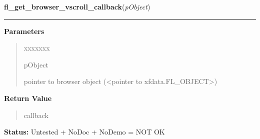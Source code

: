 \hspace{.8\funcindent}\begin{boxedminipage}{\funcwidth}

    \raggedright \textbf{fl\_get\_browser\_vscroll\_callback}(\textit{pObject})

    \vspace{-1.5ex}

    \rule{\textwidth}{0.5\fboxrule}
\setlength{\parskip}{2ex}
\setlength{\parskip}{1ex}
      \textbf{Parameters}
      \vspace{-1ex}

      \begin{quote}
        \begin{Ventry}{xxxxxxx}

          \item[pObject]

          pointer to browser object ({\textless}pointer to 
          xfdata.FL\_OBJECT{\textgreater})

        \end{Ventry}

      \end{quote}

      \textbf{Return Value}
    \vspace{-1ex}

      \begin{quote}
      callback

      \end{quote}

\textbf{Status:} Untested + NoDoc + NoDemo = NOT OK



    \end{boxedminipage}

    \label{xformslib:library:fl_add_roundbutton}

    \vspace{0.5ex}

